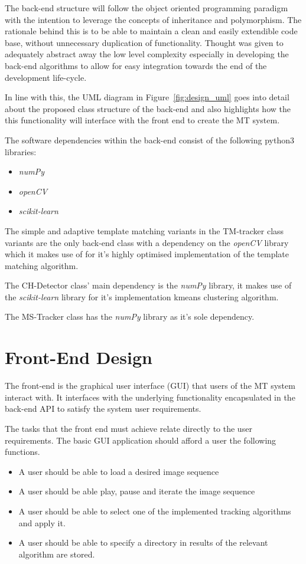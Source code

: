 The back-end structure will follow the object oriented programming paradigm with
the intention to leverage the concepts of inheritance and polymorphism. The
rationale behind this is to be able to maintain a clean and easily extendible
code base, without unnecessary duplication of functionality. Thought was given
to adequately abstract away the low level complexity especially in developing
the back-end algorithms to allow for easy integration towards the end of the
development life-cycle. 

In line with this, the UML diagram in Figure~\ref{fig:design_uml} goes into
detail about the proposed class structure of the back-end and also highlights how the 
this functionality will interface with the front end to create the MT system.


The software dependencies within the back-end consist of the following python3
libraries:
\begin{itemize}
    \item \textit{numPy}
    \item \textit{openCV}
    \item \textit{scikit-learn}
\end{itemize}

The simple and adaptive template matching variants in the TM-tracker class variants are the only
back-end class with a dependency on the \textit{openCV} library which it makes use of for it's
highly optimised implementation of the template matching algorithm.

The CH-Detector class' main dependency is the \textit{numPy} library, it makes
use of the \textit{scikit-learn} library for it's implementation kmeans clustering
algorithm.

The MS-Tracker class has the \textit{numPy} library as it's sole dependency.

\section{Front-End Design}
The front-end is the graphical user interface (GUI) that users of the MT
system interact with. 
It interfaces with the underlying functionality encapsulated in the back-end API to
satisfy the system user requirements. 

The tasks that the front end must achieve relate directly to the user
requirements. The basic GUI application should afford a user the following functions.
\begin{itemize}
    \item A user should be able to load a desired image sequence
    \item A user should be able play, pause and iterate the image sequence 
    \item A user should be able to select one of the implemented tracking
        algorithms and apply it.
    \item A user should be able to specify a directory in results of the
        relevant algorithm are stored.
\end{itemize}

